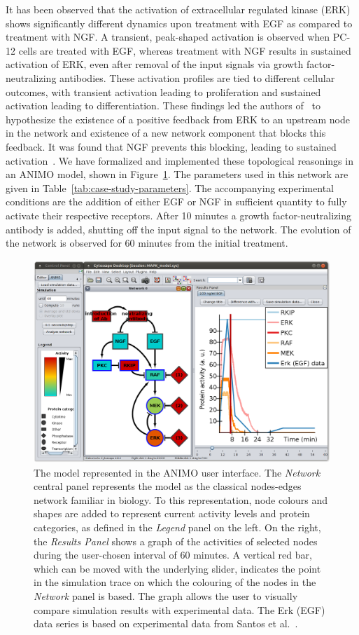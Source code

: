 \documentclass[journal, 10pt]{IEEEtran}
\begin{document}
It has been observed that the activation of extracellular regulated kinase (ERK) shows significantly different 
dynamics upon treatment with EGF as compared to treatment with NGF. A transient, peak-shaped 
activation is observed when PC-12 cells are treated with EGF, whereas treatment with NGF results in sustained activation of ERK,
even after removal of the input signals via growth factor-neutralizing antibodies. These activation profiles are tied to different cellular 
outcomes, with transient activation leading to proliferation and sustained activation leading to differentiation. 
These findings led the authors of~\cite{egf-ngf} to hypothesize the existence of a positive feedback from ERK to an upstream node in the network and 
existence of a new network component that blocks this feedback. It was found that NGF prevents this blocking, leading to sustained activation~\cite{egf-ngf}.
We have formalized and implemented these topological reasonings in an ANIMO model, shown in Figure~\ref{fig:case-study-model}. 
The parameters used in this network are given in Table~\ref{tab:case-study-parameters}.
The accompanying experimental conditions are the addition of either EGF or NGF
in sufficient quantity to fully activate their respective receptors. After 10 minutes a growth factor-neutralizing 
antibody is added, shutting off the input signal to the network. The evolution of the network is
observed for 60 minutes from the initial treatment.

\begin{figure}[htb]
\centering
  \includegraphics[width=.48\textwidth]{mapk_model_egf}
\caption{The model represented in the ANIMO user interface.
The \emph{Network} central panel represents the model as the classical nodes-edges network
familiar in biology. To this representation, node colours and shapes are added %
to represent current activity levels and protein categories, as defined in the \emph{Legend}
panel on the left. On the right, the \emph{Results Panel} shows a graph of the activities
of selected nodes during the user-chosen interval of 60 minutes.
A vertical red bar, which can be moved with the underlying slider, indicates the point in
the simulation trace on which the colouring of the nodes in the \emph{Network} panel is based.
The graph allows the user to visually compare simulation results with experimental data.
The {\sf Erk (EGF) data} series is based on experimental data from Santos et al.~\cite{egf-ngf}.
}\label{fig:case-study-model}
\end{figure}
\end{document}
